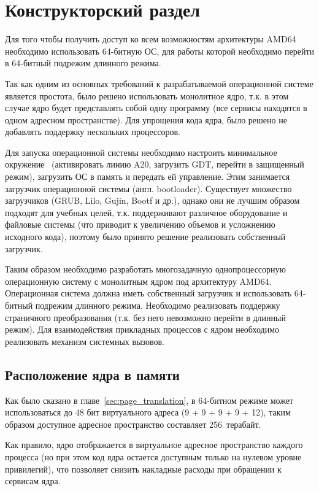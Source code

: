 \chapter{Конструкторский раздел}
\label{cha:design}

Для того чтобы получить доступ ко всем возможностям архитектуры AMD64
необходимо использовать 64-битную ОС, для работы которой необходимо перейти в 64-битный
подрежим длинного режима.

Так как одним из основных требований к разрабатываемой операционной системе
является простота, было решено использовать монолитное ядро, т.к. в этом
случае ядро будет представлять собой одну программу (все сервисы находятся в
одном адресном пространстве). Для упрощения кода ядра, было решено
не добавлять поддержку нескольких процессоров.

Для запуска операционной системы необходимо настроить минимальное окружение~\cite{mstu_os_dev_method} (активировать линию A20,
загрузить GDT, перейти в защищенный режим), загрузить ОС в память и передать ей управление.
Этим занимается загрузчик операционной системы (англ. bootloader). Существует множество загрузчиков
(GRUB, Lilo, Gujin, Bootf и др.), однако они не лучшим образом подходят для учебных целей, т.к. поддерживают
различное оборудование и файловые системы (что приводит к увеличению объемов и усложнению исходного кода),
поэтому было принято решение реализовать собственный загрузчик.

Таким образом необходимо разработать многозадачную однопроцессорную операционную систему с
монолитным ядром под архитектуру AMD64. Операционная система должна
иметь собственный загрузчик и использовать 64-битный подрежим длинного режима. Необходимо
реализовать поддержку страничного преобразования (т.к. без него невозможно перейти в длинный режим).
Для взаимодействия прикладных процессов с ядром необходимо реализовать механизм системных вызовов.


\section{Расположение ядра в памяти}
Как было сказано в главе~\ref{sec:page_translation}, в 64-битном режиме может использоваться
до 48 бит виртуального адреса (9 + 9 + 9 + 9 + 12), таким образом доступное адресное пространство
составляет 256~терабайт.

Как правило, ядро отображается в виртуальное адресное пространство каждого процесса (но при этом код ядра
остается доступным только на нулевом уровне привилегий), что позволяет снизить накладные расходы при
обращении к сервисам ядра.

